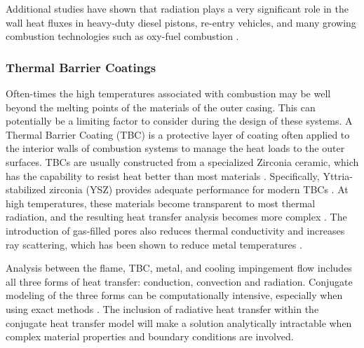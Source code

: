 Additional studies have shown that radiation plays a very significant role in the wall heat fluxes in heavy-duty diesel pistons, re-entry vehicles, and many growing combustion technologies such as oxy-fuel combustion \cite{Modest2016RadiativeSystems}.


\subsubsection{Thermal Barrier Coatings}
Often-times the high temperatures associated with combustion may be well beyond the melting points of the materials of the outer casing. This can potentially be a limiting factor to consider during the design of these systems.
A Thermal Barrier Coating (TBC) is a protective layer of coating often applied to the interior walls of combustion systems to manage the heat loads to the outer surfaces. 
TBCs are usually constructed from a specialized Zirconia ceramic, which has the capability to resist heat
better than most materials \cite{Miller1997ThermalDirections}. Specifically, Yttria-stabilized zirconia (YSZ) provides adequate performance for modern TBCs \cite{Padture2002ThermalApplications}. At high temperatures, these materials become transparent to most thermal radiation, and the resulting heat transfer analysis becomes more complex \cite{Howell2010ThermalTransfer, Siegel1998AnalysisCoatings}. The
introduction of gas-filled pores also reduces thermal conductivity and increases ray scattering, which has been shown to reduce metal temperatures \cite{Boissonnet2019EvolutionTemperature,Spuckler1996Two-FluxLayers}.

Analysis between the flame, TBC, metal, and cooling impingement flow includes all three forms of heat
transfer: conduction, convection and radiation. Conjugate modeling of the three forms can be computationally intensive, especially when using exact methods \cite{Viskanta1975HeatSolids}. 
The inclusion of radiative heat transfer within the conjugate heat transfer model will make a solution analytically intractable when complex material properties and boundary conditions are involved.

